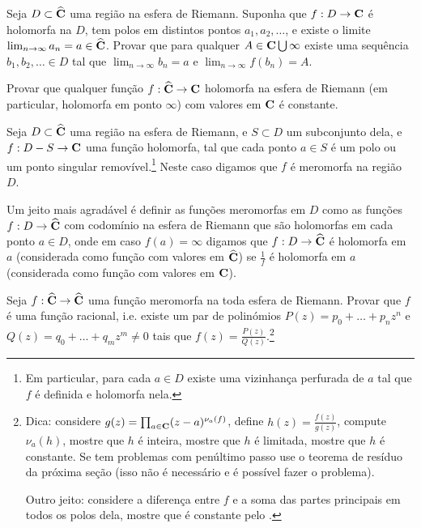 \begin{problema}
Seja $D\subset\widehat{\mathbf{C}}$ uma região na esfera de Riemann.
Suponha que $f : D \to \mathbf{C}$ é holomorfa na $D$,
tem polos em distintos pontos $a_1,a_2,\dots$,
e existe o limite $\lim_{n\to\infty} a_n = a\in\widehat{\mathbf{C}}$.
Provar que para qualquer $A\in\mathbf{C}\bigcup\infty$ existe uma sequência
$b_1,b_2,\dots\in D$ tal que $\lim_{n\to\infty} b_n = a$
e $\lim_{n\to\infty} f(b_n) = A$.
\end{problema}

\begin{problema}
Provar que qualquer função $f: \widehat{\mathbf{C}} \to \mathbf{C}$
holomorfa na esfera de Riemann (em particular, holomorfa em ponto $\infty$)
com valores em $\mathbf{C}$ é constante.
\end{problema}

\begin{defin}
Seja $D\subset\widehat{\mathbf{C}}$ uma região na esfera de Riemann,
e $S\subset D$ um subconjunto dela,
e $f : D - S\to\mathbf{C}$ uma função holomorfa,
tal que cada ponto $a\in S$ é um polo ou
um ponto singular removível.\footnote{Em particular,
para cada $a\in D$ existe uma vizinhança perfurada de $a$
tal que $f$ é definida e holomorfa nela.}
Neste caso digamos que $f$ é meromorfa na região $D$.

Um jeito mais agradável é definir as funções meromorfas em $D$
como as funções $f: D\to \widehat{\mathbf{C}}$ com codomínio na esfera de Riemann
que são holomorfas em cada ponto $a\in D$, onde
em caso $f(a) = \infty$ digamos que $f : D\to\widehat{\mathbf{C}}$ é holomorfa em $a$
(considerada como função com valores em $\widehat{\mathbf{C}}$)
se $\frac{1}{f}$ é holomorfa em $a$ (considerada como função com valores em $\mathbf{C}$).
\end{defin}

\begin{problema}
Seja $f: \widehat{\mathbf{C}} \to \widehat{\mathbf{C}}$ uma função meromorfa na toda esfera de Riemann.
Provar que $f$ é uma função racional, i.e. existe um par de polinómios
$P(z) = p_0 + \dots + p_n z^n$ e $Q(z) = q_0 + \dots + q_m z^m \neq 0$
tais que $f(z) = \frac{P(z)}{Q(z)}$.\footnote{Dica:
considere $g(z) = \prod_{a\in\mathbf{C}} (z-a)^{\nu_a(f)}$,
define $h(z) = \frac{f(z)}{g(z)}$, compute $\nu_a(h)$,
mostre que $h$ é inteira,
mostre que $h$ é limitada,
mostre que $h$ é constante.
Se tem problemas com penúltimo passo use o teorema de resíduo da próxima seção
(isso não é necessário e é possível fazer o problema).

Outro jeito: considere a diferença entre $f$ e a soma
das partes principais em todos os polos dela,
mostre que é constante pelo .}
\end{problema}


